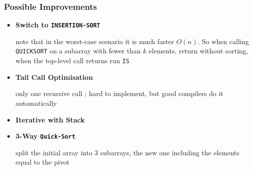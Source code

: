 	\subsubsection{Possible Improvements}
		\begin{itemize}
				\item[]\textbf{Switch to \texttt{INSERTION-SORT}}\par{note that
								in the worst-case scenario it is much faster
								$O(n)$. So when calling \texttt{QUICKSORT} on a
								subarray with fewer than $k$ elements, return
								without sorting, when the top-level call returns
								run \texttt{IS}
						}
				\item[]\textbf{Tail Call Optimisation}\par{only one recursive
								call ; hard to implement, but good compilers do
						it automatically}
				\item[]\textbf{Iterative with Stack}
				\item[]\textbf{3-Way \texttt{Quick-Sort}}\par{split the initial
								array into 3 subarrays, the new one including
						the elements equal to the pivot}
		\end{itemize}
